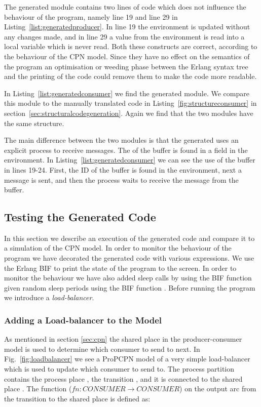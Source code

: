 The generated  module contains two lines of code which does not influence the behaviour of the program, namely line 19 and line 29 in Listing~\ref{list:generatedproducer}. In line 19 the environment is updated without any changes made, and in line 29 a value from the environment is read into a local variable which is never read. Both these constructs are correct, according to the behaviour of the CPN model. Since they have no effect on the semantics of the program an optimisation or weeding phase between the Erlang syntax tree and the printing of the code could remove them to make the code more readable.

In Listing~\ref{list:generatedconsumer} we find the generated  module. We compare this module to the manually translated code in Listing~\ref{fig:structureconsumer} in section~\ref{sec:structuralcodegeneration}. Again we find that the two modules have the same structure.



The main difference between the two  modules is that the generated  uses an explicit  process to receive messages. The  of the buffer is found in a field in the environment. In Listing~\ref{list:generatedconsumer} we can see the use of the buffer in lines 19-24. First, the ID of the buffer is found in the environment, next a  message is sent, and then the  process waits to receive the message from the buffer.

\subsection{Testing the Generated Code}
In this section we describe an execution of the generated code and compare it to a simulation of the CPN model. In order to monitor the behaviour of the program we have decorated the generated code with various expressions. We use the Erlang BIF  to print the state of the program to the screen. In order to monitor the behaviour we have also added sleep calls by using the BIF function  given random sleep periods using the BIF function . Before running the program we introduce a \emph{load-balancer}.

\subsubsection{Adding a Load-balancer to the Model}
As mentioned in section \ref{sec:cpn} the shared place  in the producer-consumer model is used to determine which consumer to send to next. In Fig.~\ref{fig:loadbalancer} we see a  ProPCPN model of a very simple load-balancer which is used to update which consumer to send to. The process partition contains the process place , the transition , and it is connected to the shared place . The function  ($fn: CONSUMER \rightarrow CONSUMER$) on the output arc from the transition  to the shared place  is defined as:

